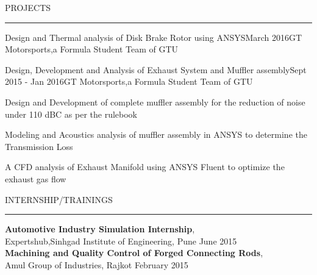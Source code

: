\documentclass{resume} %
\renewenvironment{rSection}[1]{
\sectionskip
\textcolor{TsinghuaPurple}{\MakeUppercase{#1}}
\sectionlineskip
\hrule
\begin{list}{}{
\setlength{\leftmargin}{0em}
}
\item[]
}{
\end{list}
}
\begin{document}
\begin{rSection}{PROJECTS}
\begin{rSubsection}{Design and Thermal analysis of Disk Brake Rotor using ANSYS}{March 2016}{GT Motorsports,a Formula Student Team of GTU}{}
\end{rSubsection}


\begin{rSubsection}{Design, Development and Analysis of Exhaust System and  Muffler assembly}{Sept 2015 - Jan 2016}{GT Motorsports,a Formula Student Team of GTU}{}    

\item Design and Development of complete muffler assembly for the reduction of noise under 110 dBC as per the rulebook        
\item Modeling and Acoustics analysis of muffler assembly in ANSYS to determine the  Transmission Loss
\item A CFD analysis of Exhaust Manifold using ANSYS Fluent to optimize the exhaust gas flow

\end{rSubsection} 

\end{rSection} 


\begin{rSection}{INTERNSHIP/TRAININGS} \itemsep -3pt  

{\textbf{Automotive Industry Simulation Internship}, \\Expertshub,Sinhgad Institute of Engineering, Pune } \hfill June 2015 \\   
{\textbf{Machining and Quality Control of Forged Connecting Rods}, \\Amul Group of Industries, Rajkot} \hfill February 2015 \\     

\end{rSection}  
 
  
\end{document}
